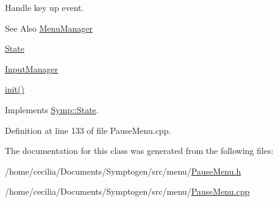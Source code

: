 Handle key up event. 

\begin{DoxySeeAlso}{See Also}
\hyperlink{class_symp_1_1_menu_manager}{Menu\-Manager} 

\hyperlink{class_symp_1_1_state}{State} 

\hyperlink{class_symp_1_1_input_manager}{Input\-Manager} 

\hyperlink{class_symp_1_1_pause_menu_af456bb275fc71d5a9ee3290e5d82cd90}{init()} 
\end{DoxySeeAlso}


Implements \hyperlink{class_symp_1_1_state_a67d0fc2a02808bbcfdb06935c3be404f}{Symp\-::\-State}.



Definition at line 133 of file Pause\-Menu.\-cpp.



The documentation for this class was generated from the following files\-:\begin{DoxyCompactItemize}
\item 
/home/cecilia/\-Documents/\-Symptogen/src/menu/\hyperlink{_pause_menu_8h}{Pause\-Menu.\-h}\item 
/home/cecilia/\-Documents/\-Symptogen/src/menu/\hyperlink{_pause_menu_8cpp}{Pause\-Menu.\-cpp}\end{DoxyCompactItemize}
